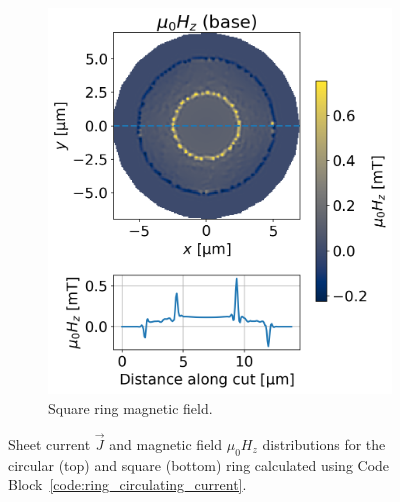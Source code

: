 \documentclass[preprint,12pt]{elsarticle}
\begin{document}
\begin{figure}
\begin{subfigure}{.4\textwidth}
  \includegraphics[width=\linewidth]{examples/images/ring/circular_ring_circ_plot_fields.png}
  \caption{Square ring magnetic field.}
  \label{fig:square_ring_plot_fields}
\end{subfigure}

\caption{Sheet current $\vec{J}$ and magnetic field $\mu_0H_z$ distributions for the circular (top) and square (bottom) ring calculated using Code Block~\ref{code:ring_circulating_current}.}
\label{fig:ring_circulating_current}
\end{figure}
\end{document}
